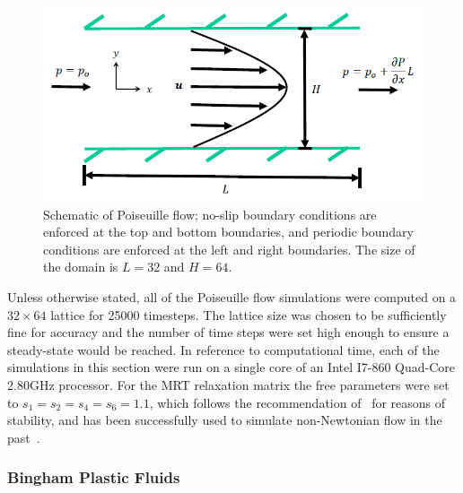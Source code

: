 \begin{figure}
	\centering
    \includegraphics[width=\linewidth]{figs/poise-schematic}
    \caption{Schematic of Poiseuille flow; no-slip boundary conditions are enforced at the top and bottom boundaries, and periodic boundary conditions are enforced at the left and right boundaries.
The size of the domain is $L = 32$  and $H = 64$.}
    \label{fig:poise-schematic}
\end{figure}

Unless otherwise stated, all of the Poiseuille flow simulations were computed on a $32 \times 64$ lattice for 25000 timesteps.
The lattice size was chosen to be sufficiently fine for accuracy and the number of time steps were set high enough to ensure a steady-state would be reached.
In reference to computational time, each of the simulations in this section were run on a single core of an Intel I7-860 Quad-Core 2.80GHz processor.
For the MRT relaxation matrix the free parameters were set to $s_1 = s_2 = s_4 = s_6 = 1.1$, which follows the recommendation of~\cite{lallemand2000theory} for reasons of stability, and has been successfully used to simulate non-Newtonian flow in the past~\cite{fallah2012multiple,grasinger2015simulation}.

\subsubsection{Bingham Plastic Fluids} \label{sec:poise-bing}

